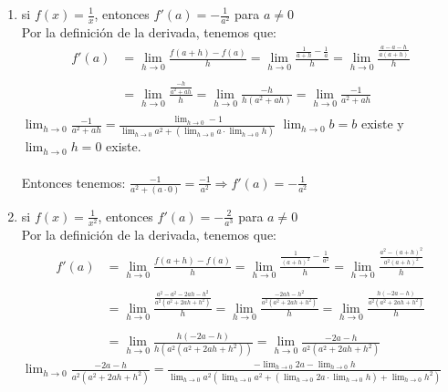 \documentclass[12pt]{article}
\begin{document}
\begin{enumerate}[\hspace{9px} a)]
    \item si \(f(x)=\displaystyle\frac{1}{x}\), entonces \(f'(a)=-\displaystyle\frac{1}{a^2}\) para \(a \neq 0\)\\

        Por la definición de la derivada, tenemos que:
        \begin{align*}
            f'(a)&=\displaystyle\lim_{h \to 0}\frac{f(a+h)-f(a)}{h}=\displaystyle\lim_{h \to 0}\frac{\displaystyle\frac{1}{a+h}-\frac{1}{a}}{h} = \displaystyle\lim_{h \to 0}\frac{\displaystyle\frac{a-a-h}{a(a+h)}}{h}\\ \\
            &=\displaystyle\lim_{h \to 0}\frac{\displaystyle\frac{-h}{a^2+ah}}{h}=\displaystyle\lim_{h \to 0}\frac{-h}{h(a^2+ah)}=\displaystyle\lim_{h \to 0}\frac{-1}{a^2+ah}\\
        \end{align*}
        \(\displaystyle\lim_{h \to 0}\frac{-1}{a^2+ah} = \frac{\displaystyle\lim_{h \to 0}-1}{\displaystyle\lim_{h \to 0}a^2+(\displaystyle\lim_{h \to 0}a \cdot \displaystyle\lim_{h \to 0}h)}\) \qquad
        \(\displaystyle\lim_{h \to 0}b=b\) existe y \(\displaystyle\lim_{h \to 0}h=0\) existe.\\ \\

        Entonces tenemos: \quad \(\displaystyle\frac{-1}{a^2+(a \cdot 0)}=\frac{-1}{a^2} \Longrightarrow f'(a)=-\frac{1}{a^2}\)\medskip

    \item si \(f(x)=\displaystyle\frac{1}{x^2}\), entonces \(f'(a)=-\displaystyle\frac{2}{a^3}\) para \(a \neq 0\)\\

        Por la definición de la derivada, tenemos que:
        \begin{align*}
            f'(a)&=\displaystyle\lim_{h \to 0}\frac{f(a+h)-f(a)}{h}=\displaystyle\lim_{h \to 0}\frac{\displaystyle\frac{1}{(a+h)^2}-\frac{1}{a^2}}{h}=\displaystyle\lim_{h \to 0}\frac{\displaystyle\frac{a^2-(a+h)^2}{a^2(a+h)^2}}{h}\\ \\
            &=\displaystyle\lim_{h \to 0}\frac{\displaystyle\frac{a^2-a^2-2ah-h^2}{a^2(a^2+2ah+h^2)}}{h}=\displaystyle\lim_{h \to 0}\frac{\displaystyle\frac{-2ah-h^2}{a^2(a^2+2ah+h^2)}}{h}=\displaystyle\lim_{h \to 0}\frac{\displaystyle\frac{h(-2a-h)}{a^2(a^2+2ah+h^2)}}{h}\\ \\
            &=\displaystyle\lim_{h \to 0}\frac{h(-2a-h)}{h(a^2(a^2+2ah+h^2))}=\displaystyle\lim_{h \to 0}\frac{-2a-h}{a^2(a^2+2ah+h^2)}
        \end{align*}
        \(\displaystyle\lim_{h \to 0}\frac{-2a-h}{a^2(a^2+2ah+h^2)}=\displaystyle\frac{-\displaystyle\lim_{h \to 0}2a-\displaystyle\lim_{h \to 0}h}{\displaystyle\lim_{h \to 0}a^2(\displaystyle\lim_{h \to 0}a^2+(\displaystyle\lim_{h \to 0}2a \cdot \displaystyle\lim_{h \to 0}h)+\displaystyle\lim_{h \to 0}h^2)}\)\\ \\


\end{enumerate}
\end{document}

